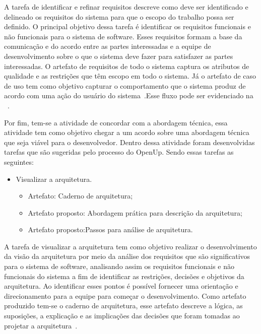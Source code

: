%

A tarefa de identificar e refinar requisitos descreve como deve ser identificado e delineado os requisitos do sistema para que o escopo do trabalho possa ser definido. O principal objetivo dessa tarefa é identificar os requisitos funcionais e não funcionais para o sistema de software. Esses requisitos formam a base da comunicação e do acordo entre as partes interessadas e a equipe de desenvolvimento sobre o que o sistema deve fazer para satisfazer as partes interessadas. O artefato de requisitos de todo o sistema captura os atributos de qualidade e as restrições que têm escopo em todo o sistema. Já o artefato de caso de uso tem como objetivo capturar o comportamento que o sistema produz de acordo com uma ação do usuário do sistema~\cite{openup}.Esse fluxo pode ser evidenciado na ~.


Por fim, tem-se a atividade de concordar com a abordagem técnica, essa atividade tem como objetivo chegar a um acordo sobre uma abordagem técnica que seja viável para o desenvolvedor. Dentro dessa atividade foram desenvolvidas tarefas que são sugeridas pelo processo do \acrfull{OpenUp}. Sendo essas tarefas as seguintes:
\begin{itemize}
    \item Visualizar a arquitetura.
    \begin{itemize}
        \item Artefato: Caderno de arquitetura;
        \item Artefato proposto: Abordagem prática para descrição da arquitetura;
        \item Artefato proposto:Passos para análise de arquitetura.
    \end{itemize}
\end{itemize}

A tarefa de visualizar a arquitetura tem como objetivo realizar o desenvolvimento da visão da arquitetura por meio da análise dos requisitos que são significativos para o sistema de software, analisando assim os requisitos funcionais e não funcionais do sistema a fim de identificar as restrições, decisões e objetivos da arquitetura. Ao identificar esses pontos é possível fornecer uma orientação e direcionamento para a equipe para começar o desenvolvimento. Como artefato produzido tem-se o caderno de arquitetura, esse artefato descreve a lógica, as suposições, a explicação e as implicações das decisões que foram tomadas ao projetar a arquitetura~\cite{openup}.


